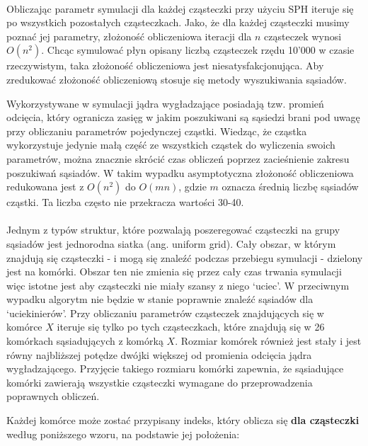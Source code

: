 \paragraph{}
Obliczając parametr symulacji dla każdej cząsteczki przy użyciu SPH iteruje się po wszystkich pozostałych cząsteczkach. Jako, że dla każdej cząsteczki musimy poznać jej parametry, złożoność obliczeniowa iteracji dla $n$ cząsteczek wynosi $O(n^2)$. Chcąc symulować płyn opisany liczbą cząsteczek rzędu 10'000 w czasie rzeczywistym, taka złożoność obliczeniowa jest niesatysfakcjonująca. Aby zredukować złożoność obliczeniową stosuje się metody wyszukiwania sąsiadów.
\par
Wykorzystywane w symulacji jądra wygładzające posiadają tzw. promień odcięcia, który ogranicza zasięg w jakim poszukiwani są sąsiedzi brani pod uwagę przy obliczaniu parametrów pojedynczej cząstki. Wiedząc, że cząstka wykorzystuje jedynie małą część ze wszystkich cząstek do wyliczenia swoich parametrów, można znacznie skrócić czas obliczeń poprzez zacieśnienie zakresu poszukiwań sąsiadów. W takim wypadku asymptotyczna złożoność obliczeniowa redukowana jest z $O(n^2)$ do $O(mn)$, gdzie $m$ oznacza średnią liczbę sąsiadów cząstki. Ta liczba często nie przekracza wartości 30-40.
\par

\paragraph{}
Jednym z typów struktur, które pozwalają poszeregować cząsteczki na grupy sąsiadów jest jednorodna siatka (ang. uniform grid). Cały obszar, w którym znajdują się cząsteczki - i mogą się znaleźć podczas przebiegu symulacji - dzielony jest na komórki. Obszar ten nie zmienia się przez cały czas trwania symulacji więc istotne jest aby cząsteczki nie miały szansy z niego `uciec'. W przeciwnym wypadku algorytm nie będzie w stanie poprawnie znaleźć sąsiadów dla `uciekinierów'. Przy obliczaniu parametrów cząsteczek znajdujących się w komórce $X$ iteruje się tylko po tych cząsteczkach, które znajdują się w 26 komórkach sąsiadujących z komórką $X$. Rozmiar komórek również jest stały i jest równy najbliższej potędze dwójki większej od promienia odcięcia jądra wygładzającego. Przyjęcie takiego rozmiaru komórki zapewnia, że sąsiadujące komórki zawierają wszystkie cząsteczki wymagane do przeprowadzenia poprawnych obliczeń.
\par
Każdej komórce może zostać przypisany indeks, który oblicza się \textbf{dla cząsteczki} według poniższego wzoru, na podstawie jej położenia:

